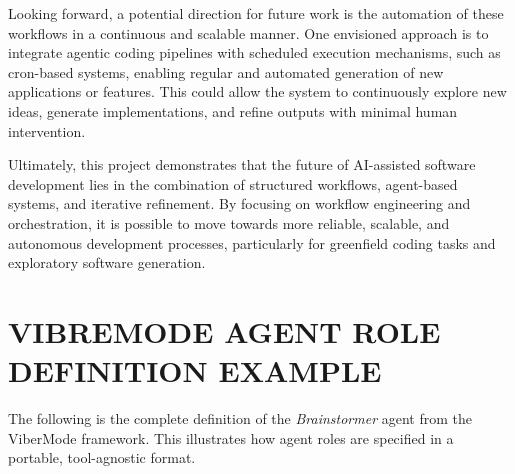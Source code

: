 \documentclass[a4paper,12pt]{report}
\begin{document}
Looking forward, a potential direction for future work is the automation of these workflows in a continuous and scalable manner. One envisioned approach is to integrate agentic coding pipelines with scheduled execution mechanisms, such as cron-based systems, enabling regular and automated generation of new applications or features. This could allow the system to continuously explore new ideas, generate implementations, and refine outputs with minimal human intervention.

Ultimately, this project demonstrates that the future of AI-assisted software development lies in the combination of structured workflows, agent-based systems, and iterative refinement. By focusing on workflow engineering and orchestration, it is possible to move towards more reliable, scalable, and autonomous development processes, particularly for greenfield coding tasks and exploratory software generation.




\appendix	

\chapter{VIBREMODE AGENT ROLE DEFINITION EXAMPLE}
\label{app:agentDef}

The following is the complete definition of the \textit{Brainstormer} agent from the ViberMode framework. This illustrates how agent roles are specified in a portable, tool-agnostic format.
\end{document}

